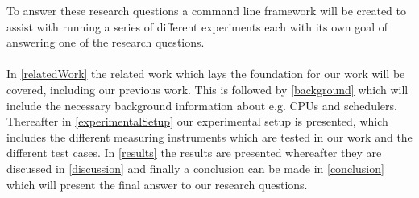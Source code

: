 To answer these research questions a command line framework will be created to assist with running a series of different experiments each with its own goal of answering one of the research questions. 

\paragraph{}
In \cref{relatedWork} the related work which lays the foundation for our work will be covered, including our previous work. This is followed by \cref{background} which will include the necessary background information about e.g. CPUs and schedulers. Thereafter in \cref{experimentalSetup} our experimental setup is presented, which includes the different measuring instruments which are tested in our work and the different test cases. %
In \cref{results} the results are presented whereafter they are discussed in \cref{discussion} and finally a conclusion can be made in \cref{conclusion} which will present the final answer to our research questions. 


